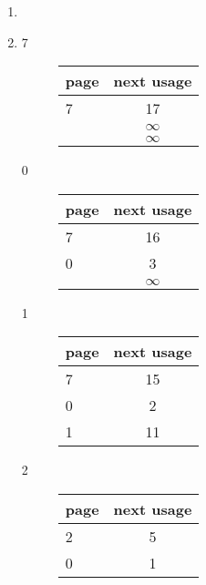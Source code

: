 \documentclass[12pt]{article}
\begin{document}
\begin{enumerate}[a]
\begin{multicols}{2}
	\end{multicols}
	\item %
	\item %
	\begin{multicols}{2}
		\begin{description}
			\item[7]
			\begin{tabular}{|p{2em}|c|}
				page & next usage\\
				\hline
				7 & 17\\
				\hline
				& $\infty$\\
				\hline
				& $\infty$\\
				\hline
			\end{tabular}
			\item[0]
			\begin{tabular}{|p{2em}|c|}
				page & next usage\\
				\hline
				7 & 16\\
				\hline
				0 & 3\\
				\hline
				& $\infty$\\
				\hline
			\end{tabular}
			\item[1]
			\begin{tabular}{|p{2em}|c|}
				page & next usage\\
				\hline
				7 & 15\\
				\hline
				0 & 2\\
				\hline
				1 & 11\\
				\hline
			\end{tabular}
			\item[2]
			\begin{tabular}{|p{2em}|c|}
				page & next usage\\
				\hline
				2 & 5\\
				\hline
				0 & 1\\

\end{tabular}
\end{description}
\end{multicols}
\end{enumerate}
\end{document}
